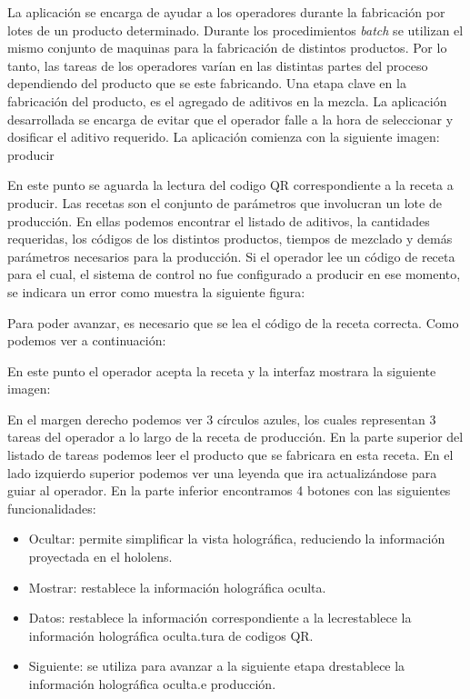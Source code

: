 La aplicación se encarga de ayudar a los operadores durante la fabricación por lotes de un producto determinado. Durante los procedimientos \textit{batch} se utilizan el mismo conjunto de maquinas para la fabricación de distintos productos. Por lo tanto, las tareas de los operadores varían en las distintas partes del proceso dependiendo del producto que se este fabricando. Una etapa clave en la fabricación del producto, es el agregado de aditivos en la mezcla. La aplicación desarrollada se encarga de evitar que el operador falle a la hora de seleccionar y dosificar el aditivo requerido. La aplicación comienza con la siguiente imagen:
producir

En este punto se aguarda la lectura del codigo QR correspondiente a la receta a producir. Las recetas son el conjunto de parámetros que involucran un lote de producción. En ellas podemos encontrar el listado de aditivos, la cantidades requeridas, los códigos de los distintos productos, tiempos de mezclado y demás parámetros necesarios para la producción. Si el operador lee un código de receta para el cual, el sistema de control no fue configurado a producir en ese momento, se indicara un error como muestra la siguiente figura:

Para poder avanzar, es necesario que se lea el código de la receta correcta. Como podemos ver a continuación: 

En este punto el operador acepta la receta y la interfaz mostrara la siguiente imagen:


En el margen derecho podemos ver 3 círculos azules, los cuales representan 3 tareas del operador a lo largo de la receta de producción. En la parte superior del listado de tareas podemos leer el producto que se fabricara en esta receta. En el lado izquierdo superior podemos ver una leyenda que ira actualizándose para guiar al operador. En la parte inferior encontramos 4 botones con las siguientes funcionalidades:

\begin{itemize}
\item Ocultar: permite simplificar la vista holográfica, reduciendo la información proyectada en el hololens.
\item Mostrar: restablece la información holográfica oculta.
\item Datos: restablece la información correspondiente a la lecrestablece la información holográfica oculta.tura de codigos QR. 
\item Siguiente: se utiliza para avanzar a la siguiente etapa drestablece la información holográfica oculta.e producción. 
\end{itemize}

